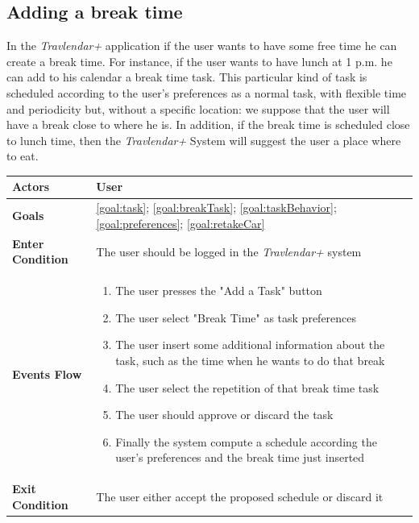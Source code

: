 \subsection{Adding a break time}
In the \emph{Travlendar+} application if the user wants to have some free time he can create a break time. For instance, if the user wants to have lunch at 1 p.m. he can add to his calendar a break time task. This particular kind of task is scheduled according to the user's preferences as a normal task, with flexible time and periodicity but, without a specific location: we suppose that the user will have a break close to where he is.
In addition, if the break time is scheduled close to lunch time, then the \emph{Travlendar+} System will suggest the user a place where to eat.


\begin{table}[H]
	\centering
    
    \begin{tabular}{|p{3.5cm}|p{10.3cm}|}
    
    \hline
    \textbf{\large{Actors}}  			& \tabitem User\\
    
    \hline
    \textbf{\large{Goals}} 				& \ref{goal:task}; \ref{goal:breakTask}; \ref{goal:taskBehavior}; \ref{goal:preferences}; \ref{goal:retakeCar}\\
    
    \hline
    \textbf{\large{Enter Condition}}	& The user should be logged in the                                                        \emph{Travlendar+} system\\
    
    \hline
    \textbf{\large{Events Flow}}		& \begin{enumerate}[leftmargin=0.5cm]
                                          	\item The user presses the "Add a Task" button
                                          	\item The user select "Break Time" as task preferences
                                          	\item The user insert some additional information about the task, such as the time when he wants to do that break
                                          	\item The user select the repetition of that break time task
                                          	\item The user should approve or discard the task
                                          	\item Finally the system compute a schedule according the user's preferences and the break time just inserted
                                          \end{enumerate}
    										\\
    \hline
    \textbf{\large{Exit Condition}} 	& The user either accept the proposed schedule or discard it\\
    

\end{tabular}
\end{table}
